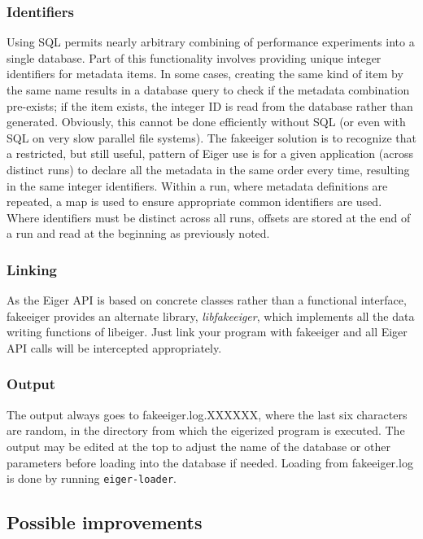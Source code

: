 \subsubsection{Identifiers} Using SQL permits nearly arbitrary combining of performance experiments into a single database. Part of this functionality involves providing unique integer identifiers for metadata items. In some cases, creating the same kind of item by the same name results in a database query to check if the metadata combination pre-exists; if the item exists, the integer ID is read from the database rather than generated. Obviously, this cannot be done efficiently without SQL (or even with SQL on very slow parallel file systems). The fakeeiger solution is to recognize that a restricted, but still useful, pattern of Eiger use is for a given application (across distinct runs) to declare all the metadata in the same order every time, resulting in the same integer identifiers. Within a run, where metadata definitions are repeated, a map is used to ensure appropriate common identifiers are used. Where identifiers must be distinct across all runs, offsets are stored at the end of a run and read at the beginning as previously noted. 

\subsubsection{Linking} As the Eiger API is based on concrete classes rather than a functional interface, fakeeiger provides an alternate library, {\em libfakeeiger}, which implements all the data writing functions of libeiger. Just link your program with fakeeiger and all Eiger API calls will be intercepted appropriately.

\subsubsection{Output} The output always goes to fakeeiger.log.XXXXXX, where the last six characters are random, in the directory from which the eigerized program is executed. The output may be edited at the top to adjust the name of the database or other parameters before loading into the database if needed. Loading from fakeeiger.log is done by running \texttt{eiger-loader}.



\subsection{Possible improvements}

